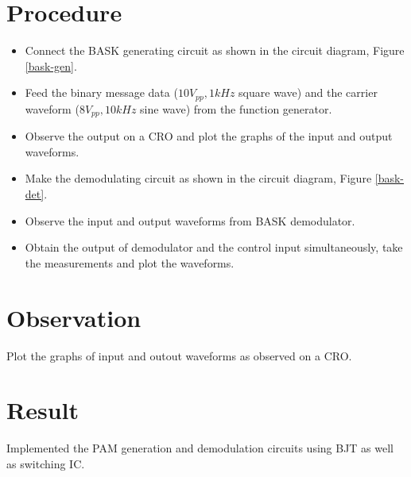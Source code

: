 \section*{Procedure}
\begin{itemize}
\item
Connect the BASK generating circuit as shown in the circuit diagram, Figure \ref{bask-gen}.
\item
Feed the binary message data ($10 V_{pp}, 1 kHz$ square wave) and the carrier waveform  ($8 V_{pp}, 10 kHz$ sine wave) from the function generator.
\item
Observe the output on a CRO and plot the graphs of the input and output waveforms.
\item
Make the demodulating circuit as shown in the circuit diagram, Figure \ref{bask-det}.
\item
Observe the input and output waveforms from BASK demodulator.
\item 
Obtain the output of demodulator and the control input simultaneously, take the measurements and plot the waveforms.

\end{itemize}
\section*{Observation}
Plot the graphs of input and outout waveforms as observed on a CRO.
\section*{Result}

Implemented the PAM generation and demodulation circuits using BJT as well as switching IC.